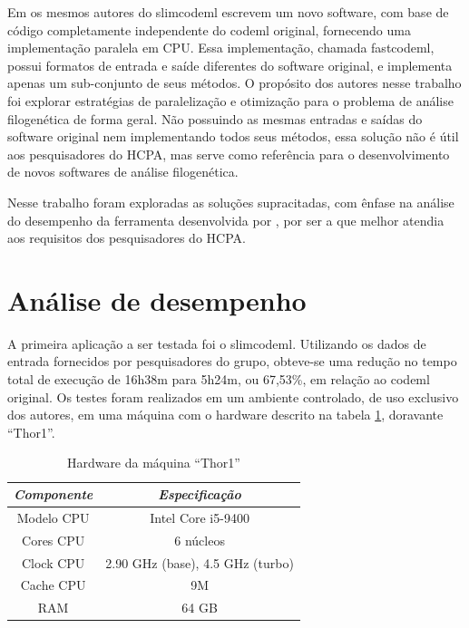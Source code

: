 \documentclass[cic,tc]{iiufrgs}
\begin{document}
Em \cite{valle2014optimization} os mesmos autores do slimcodeml escrevem um
novo software, com base de código completamente independente do codeml
original, fornecendo uma implementação paralela em CPU. Essa implementação,
chamada fastcodeml, possui formatos de entrada e saíde diferentes do software
original, e implementa apenas um sub-conjunto de seus métodos. O propósito dos
autores nesse trabalho foi explorar estratégias de paralelização e otimização
para o problema de análise filogenética de forma geral. Não possuindo as mesmas
entradas e saídas do software original nem implementando todos seus métodos,
essa solução não é útil aos pesquisadores do HCPA, mas serve como referência
para o desenvolvimento de novos softwares de análise filogenética.

Nesse trabalho foram exploradas as soluções supracitadas, com ênfase na análise
do desempenho da ferramenta desenvolvida por \cite{schabauer2012slimcodeml},
por ser a que melhor atendia aos requisitos dos pesquisadores do HCPA.

\section{Análise de desempenho}

A primeira aplicação a ser testada foi o
slimcodeml.\cite{schabauer2012slimcodeml} Utilizando os dados de entrada
fornecidos por pesquisadores do grupo, obteve-se uma redução no tempo total de
execução de 16h38m para 5h24m, ou 67,53\%, em relação ao codeml original. Os
testes foram realizados em um ambiente controlado, de uso exclusivo dos
autores, em uma máquina com o hardware descrito na tabela \ref{tbl:thor1},
doravante ``Thor1''.

\begin{table}[h]
    \caption{Hardware da máquina ``Thor1''}
    \centering
        \begin{tabular}{c|c}
          \hline
          \textit{Componente}  &   \textit{Especificação} \\
          \hline
          \hline
          Modelo CPU & Intel Core i5-9400 \\
          Cores CPU & 6 núcleos\\
          Clock CPU & 2.90 GHz (base), 4.5 GHz (turbo) \\
          Cache CPU & 9M \\
          RAM & 64 GB \\
          \hline
        \end{tabular}
    \label{tbl:thor1}
\end{table}
\end{document}
